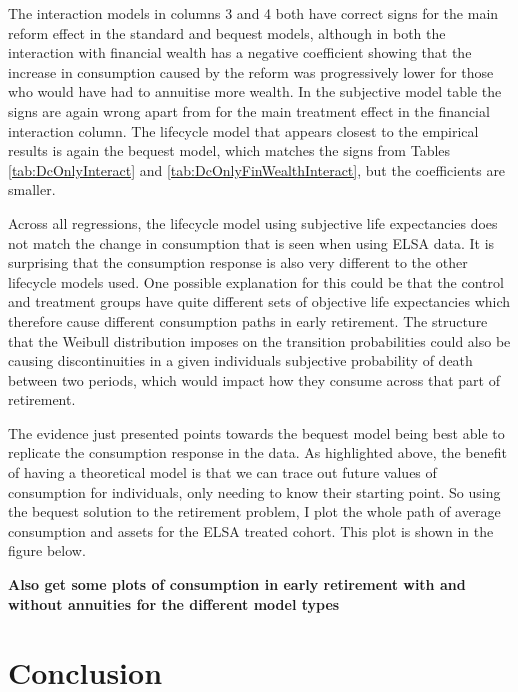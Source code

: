 \documentclass[12pt]{article}
\begin{document}
The interaction models in columns 3 and 4 both have correct signs for the main
reform effect in the standard and bequest models, although in both the
interaction with financial wealth has a negative coefficient showing that the
increase in consumption caused by the reform was progressively lower for those
who would have had to annuitise more wealth. In the subjective model table the
signs are again wrong apart from for the main treatment effect in the financial
interaction column. The lifecycle model that appears closest to the empirical
results is again the bequest model, which matches the signs from Tables
\ref{tab:DcOnlyInteract} and \ref{tab:DcOnlyFinWealthInteract}, but the
coefficients are smaller.

Across all regressions, the lifecycle model using subjective life expectancies
does not match the change in consumption that is seen when using ELSA data. It
is surprising that the consumption response is also very different to the other
lifecycle models used. One possible explanation for this could be that the
control and treatment groups have quite different sets of objective life
expectancies which therefore cause different consumption paths in early
retirement. The structure that the Weibull distribution imposes on the
transition probabilities could also be causing discontinuities in a given
individuals subjective probability of death between two periods, which would
impact how they consume across that part of retirement.

The evidence just presented points towards the bequest model being best able to
replicate the consumption response in the data. As highlighted above, the
benefit of having a theoretical model is that we can trace out future values of
consumption for individuals, only needing to know their starting point. So using
the bequest solution to the retirement problem, I plot the whole path of average
consumption and assets for the ELSA treated cohort. This plot is shown in the
figure below.



\textbf{Also get some plots of consumption in early retirement with and without
    annuities for the different model types}


\section{Conclusion}
\end{document}
